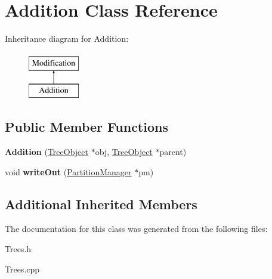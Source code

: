 \hypertarget{classAddition}{}\section{Addition Class Reference}
\label{classAddition}
Inheritance diagram for Addition\+:\begin{figure}[H]
\begin{center}
\leavevmode
\includegraphics[height=2.000000cm]{classAddition}
\end{center}
\end{figure}
\subsection*{Public Member Functions}
\begin{DoxyCompactItemize}
\item 
\mbox{\label{classAddition_a0bcd6cd605c0e90a834339a1feb20901}} 
{\bfseries Addition} (\mbox{\hyperlink{classTreeObject}{Tree\+Object}} $\ast$obj, \mbox{\hyperlink{classTreeObject}{Tree\+Object}} $\ast$parent)
\item 
\mbox{\label{classAddition_acbbe0d8b7c79cc7cdf95124ce834553c}} 
void {\bfseries write\+Out} (\mbox{\hyperlink{classPartitionManager}{Partition\+Manager}} $\ast$pm)
\end{DoxyCompactItemize}
\subsection*{Additional Inherited Members}


The documentation for this class was generated from the following files\+:\begin{DoxyCompactItemize}
\item 
Trees.\+h\item 
Trees.\+cpp\end{DoxyCompactItemize}
